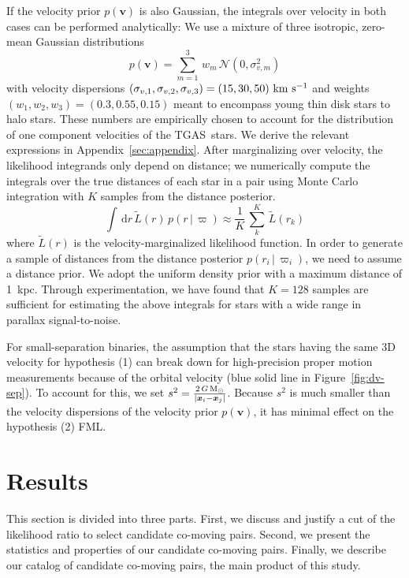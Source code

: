 \documentclass[manuscript, letterpaper]{aastex6}
\newcommand{\acronym}[1]{{\small{#1}}}
\newcommand{\tgas}{\acronym{TGAS}}
\newcommand{\given}{\,|\,}
\newcommand{\dd}{\mathrm{d}}
\newcommand{\bs}[1]{\boldsymbol{#1}}
\renewcommand{\vec}[1]{\bs{#1}}
\newcommand{\kms}{\ensuremath{\rm km~s^{-1}}}
\newcommand{\msun}{{\rm M}_\odot}
\begin{document}
If the velocity prior $p(\vec{v})$ is also Gaussian, the integrals over velocity
in both cases can be performed analytically:
We use a mixture of three isotropic, zero-mean Gaussian distributions
\begin{equation}
  p(\vec{v}) = \sum_{m=1}^3 \, w_m \, \mathcal{N}(0, \sigma_{v,m}^2)
\end{equation}
with velocity dispersions $(\sigma_{v,1}, \sigma_{v,2}, \sigma_{v,3}) = (15, 30, 50)
~\kms$ and weights $(w_1,w_2,w_3) = (0.3, 0.55, 0.15)$
meant to encompass young thin disk stars to halo stars.
These numbers are empirically chosen to account for the distribution of one
component velocities of the \tgas\ stars.
We derive the relevant expressions in Appendix~\ref{sec:appendix}.
After marginalizing over velocity, the likelihood integrands only depend on
distance; we numerically compute the integrals over the true distances of each
star in a pair using Monte Carlo integration with $K$ samples from
the distance posterior.
\begin{equation}
  \int \, \dd r \, \tilde{L}(r) \, p(r \given \varpi) \approx
    \frac{1}{K} \, \sum_k^K \, \tilde{L}(r_k)
\end{equation}
where $\tilde{L}(r)$ is the velocity-marginalized likelihood function.
In order to generate a sample of distances from the distance posterior $p(r_i \given \varpi_i)$,
we need to assume a distance prior. We adopt the uniform density prior
\citep{Bailer-Jones:2015aa} with a maximum distance of 1~kpc.
Through experimentation, we have found that $K=128$ samples are sufficient for
estimating the above integrals for stars with a wide range in parallax
signal-to-noise.

For small-separation binaries, the assumption that the stars having the same 3D velocity for
hypothesis (1) can
break down for high-precision proper motion measurements because of the orbital
velocity (blue solid line in Figure~\ref{fig:dv-sep}).
To account for this, we set $s^2 = \frac{2 \, G \, \msun}{|\vec{x}_i-\vec{x}_j|}$.
Because $s^2$ is much smaller than the velocity dispersions of the velocity prior
$p(\vec{v})$, it has minimal effect on the hypothesis (2) FML.


\section{Results} \label{sec:results}

This section is divided into three parts. First, we discuss and justify a cut of
the likelihood ratio to select candidate co-moving pairs.
Second, we present the statistics and properties of our candidate co-moving
pairs.
Finally, we describe our catalog of candidate co-moving pairs, the main product
of this study.
\end{document}
